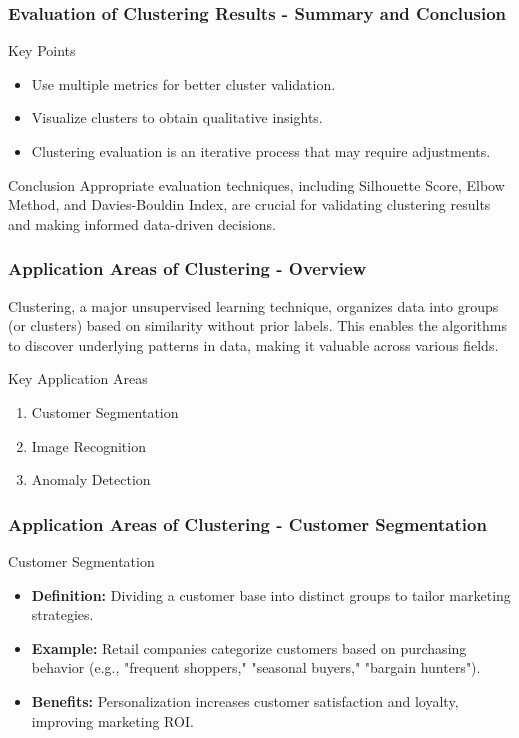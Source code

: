 \documentclass[aspectratio=169]{beamer}
\begin{document}
\begin{frame}[fragile]
    \frametitle{Evaluation of Clustering Results - Summary and Conclusion}
    \begin{block}{Key Points}
        \begin{itemize}
            \item Use multiple metrics for better cluster validation.
            \item Visualize clusters to obtain qualitative insights.
            \item Clustering evaluation is an iterative process that may require adjustments.
        \end{itemize}
    \end{block}
    
    \begin{block}{Conclusion}
        Appropriate evaluation techniques, including Silhouette Score, Elbow Method, and Davies-Bouldin Index, are crucial for validating clustering results and making informed data-driven decisions.
    \end{block}
\end{frame}

\begin{frame}[fragile]
    \frametitle{Application Areas of Clustering - Overview}
    Clustering, a major unsupervised learning technique, organizes data into groups (or clusters) based on similarity without prior labels. This enables the algorithms to discover underlying patterns in data, making it valuable across various fields.

    \begin{block}{Key Application Areas}
        \begin{enumerate}
            \item Customer Segmentation
            \item Image Recognition
            \item Anomaly Detection
        \end{enumerate}
    \end{block}
\end{frame}

\begin{frame}[fragile]
    \frametitle{Application Areas of Clustering - Customer Segmentation}
    \begin{block}{Customer Segmentation}
        \begin{itemize}
            \item \textbf{Definition:} Dividing a customer base into distinct groups to tailor marketing strategies.
            \item \textbf{Example:} Retail companies categorize customers based on purchasing behavior (e.g., "frequent shoppers," "seasonal buyers," "bargain hunters").
            \item \textbf{Benefits:} Personalization increases customer satisfaction and loyalty, improving marketing ROI.
        \end{itemize}
    \end{block}

\end{frame}
\end{document}
